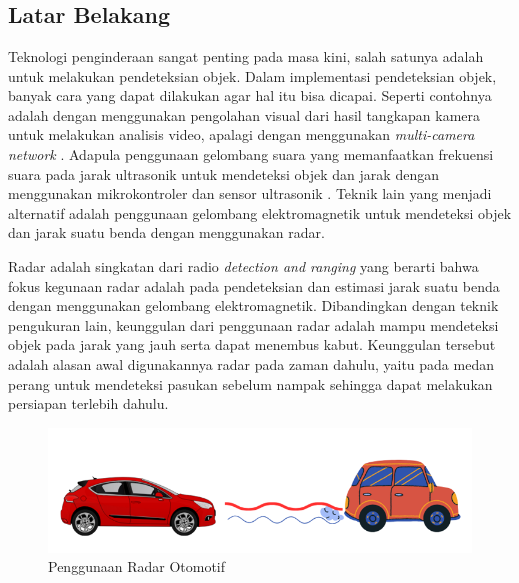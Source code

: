 \chapter{\babSatu}
\section{Latar Belakang}
Teknologi penginderaan sangat penting pada masa kini, salah satunya adalah untuk melakukan pendeteksian objek. Dalam implementasi pendeteksian objek, banyak cara yang dapat dilakukan agar hal itu bisa dicapai. Seperti contohnya adalah dengan menggunakan pengolahan visual dari hasil tangkapan kamera untuk melakukan analisis video, apalagi dengan menggunakan \textit{multi-camera network} \cite{Zhang2015}. Adapula penggunaan gelombang suara yang memanfaatkan frekuensi suara pada jarak ultrasonik untuk mendeteksi objek dan jarak dengan menggunakan mikrokontroler dan sensor ultrasonik \cite{Biswas2020}. Teknik lain yang menjadi alternatif adalah penggunaan gelombang elektromagnetik untuk mendeteksi objek dan jarak suatu benda dengan menggunakan radar. 

Radar adalah singkatan dari radio \textit{detection and ranging} yang berarti bahwa fokus kegunaan radar adalah pada pendeteksian dan estimasi jarak suatu benda dengan menggunakan gelombang elektromagnetik. Dibandingkan dengan teknik pengukuran lain, keunggulan dari penggunaan radar adalah mampu mendeteksi objek pada jarak yang jauh serta dapat menembus kabut. Keunggulan tersebut adalah alasan awal digunakannya radar pada zaman dahulu, yaitu  pada medan perang untuk mendeteksi pasukan sebelum nampak sehingga dapat melakukan persiapan terlebih dahulu. 

\begin{figure}
	\begin{center}
		\includegraphics[scale=0.5]{pics/bab1/AplikasiRadar.png} 
		\caption[Penggunaan Radar Otomotif]{Penggunaan Radar Otomotif}
		\label{pic:aplikasiRadarKini}
	\end{center}
\end{figure}

